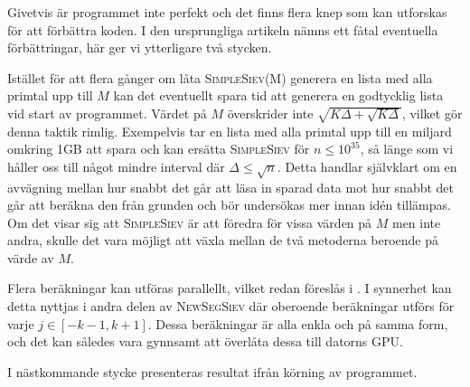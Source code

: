 


Givetvis är programmet inte perfekt och det finns flera knep som kan utforskas för att förbättra koden.
I den ursprungliga artikeln \cite{HaraldSieve} nämns ett fåtal eventuella förbättringar, här ger vi ytterligare två stycken.
\begin{myitemize}
    \item
    Istället för att flera gånger om låta \textsc{SimpleSiev(M)} generera en lista med alla primtal upp till $M$ kan det eventuellt spara tid att generera en godtycklig lista vid start av programmet.
    Värdet på $M$ överskrider inte $\sqrt{K\Delta+\sqrt{K\Delta}}$, vilket gör denna taktik rimlig.
    Exempelvis tar en lista med alla primtal upp till en miljard omkring 1GB att spara och kan ersätta \textsc{SimpleSiev} för $n\leq 10^{35}$, så länge som vi håller oss till något mindre interval där $\Delta\leq\sqrt{n}$.
    Detta handlar självklart om en avvägning mellan hur snabbt det går att läsa in sparad data mot hur snabbt det går att beräkna den från grunden och bör undersökas mer innan idén tillämpas. 
    Om det visar sig att \textsc{SimpleSiev} är att föredra för vissa värden på $M$ men inte andra, 
    skulle det vara möjligt att växla mellan de två metoderna beroende på värde av $M$.
    \item
    Flera beräkningar kan utföras parallellt, vilket redan föreslås i \cite{HaraldSieve}. 
    I synnerhet kan detta nyttjas i andra delen av \textsc{NewSegSiev} där oberoende beräkningar utförs för varje $j\in[-k-1,k+1]$.
    Dessa beräkningar är alla enkla och på samma form, och det kan således vara gynnsamt att överlåta dessa till datorns GPU.
\end{myitemize}

I nästkommande stycke presenteras resultat ifrån körning av programmet.


\begin{comment}
    \item
    Deklaration av temporära variabler har i vissa fall kunnat uteslutas genom sammanskrivning av flera uttryck. 
    Ett specialfall av detta nyttjas i \textsc{DiophAppr} där vi har ersatt uttryck på formen \texttt{temp=x; x=y; y=temp;} med det snabbare \texttt{x,y=y,x;}.

    \item Flera while-loopar har kunnat ersättas med for-loopar,
    som ger att istället för att testa ett argument för varje iteration i loopen,
    behöver argumentet bara testas en gång när loopen påbörjas.
    \item Infogande av iteratorer vid iterering över primtalslistor, vilket också resulterar i bättre nyttjande av cache.

    \item
    I \textsc{DiophAppr} beräknas både heltals- och decimaldelen av $\alpha$. Detta görs i nuläget separat men skulle kunna göras samtidigt.
    Förslagsvis skulle då if-satsen ändras till att testa ifall decimaldelen är noll.
\end{comment}